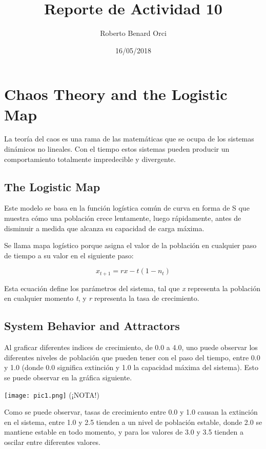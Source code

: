 \documentclass{article}
\title{Reporte de Actividad 10}
\author{Roberto Benard Orci}
\date{16/05/2018}
\begin{document}
\maketitle

\section{Chaos Theory and the Logistic Map}

La teoría del caos es una rama de las matemáticas que se ocupa de los sistemas dinámicos no lineales. Con el tiempo estos sistemas pueden producir un comportamiento totalmente impredecible y divergente.

\subsection{The Logistic Map}

Este modelo se basa en la función logística común de curva en forma de S que muestra cómo una población crece lentamente, luego rápidamente, antes de disminuir a medida que alcanza su capacidad de carga máxima. 

Se llama mapa logístico porque asigna el valor de la población en cualquier paso de tiempo a su valor en el siguiente paso:

 \begin{equation}
 x_{t+1}=rx-{t}(1-n_{t})
 \end{equation}

Esta ecuación define los parámetros del sistema, tal que \textit{x} representa la población en cualquier momento \textit{t}, y \textit{r} representa la tasa de crecimiento.

\subsection{System Behavior and Attractors}

Al graficar diferentes indices de crecimiento, de 0.0 a 4.0, uno puede observar los diferentes niveles de población que pueden tener con el paso del tiempo, entre 0.0 y 1.0 (donde 0.0 significa extinción y 1.0 la capacidad máxima del sistema). Esto se puede observar en la gráfica siguiente.

\begin{center}
	\texttt{[image: pic1.png]}
    (¡NOTA!)
\end{center}
\vspace{0.3cm}


Como se puede observar, tasas de crecimiento entre 0.0 y 1.0 causan la extinción en el sistema, entre 1.0 y 2.5 tienden a un nivel de población estable, donde 2.0 se mantiene estable en todo momento, y para los valores de 3.0 y 3.5 tienden a oscilar entre diferentes valores.  
\end{document}
